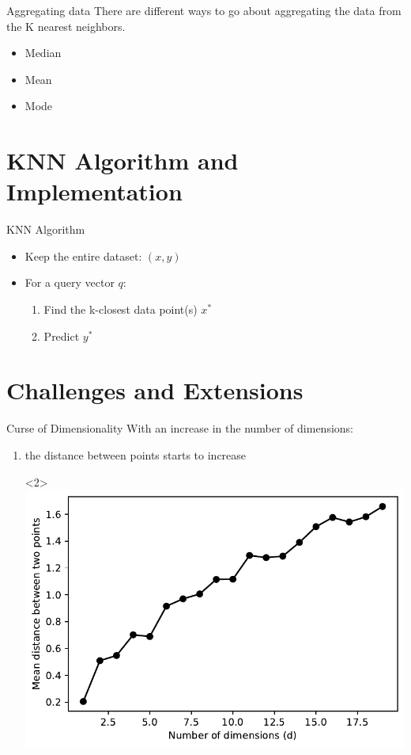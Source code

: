 \documentclass[usenames,dvipsnames]{beamer}
\begin{document}
\begin{frame}{Aggregating data}
	There are different ways to go about aggregating the data from the K nearest neighbors.
	
	
	\begin{itemize}
		\item Median
		\item Mean
		\item Mode
	\end{itemize}
\end{frame}

\section{KNN Algorithm and Implementation}

\begin{frame}{KNN Algorithm}
\begin{itemize}
\item<1-> Keep the entire dataset: ${(x,y)}$
\item<2-> For a query vector $q$:
\begin{enumerate}
\item<3-> Find the k-closest data point(s) $x^*$
\item<4-> Predict $y^*$
\end{enumerate}
\end{itemize}
\end{frame}

\section{Challenges and Extensions}

\begin{frame}{Curse of Dimensionality}
With an increase in the number of dimensions:
\begin{enumerate}
\item<2-> the distance between points starts to increase
\item[]<2> {\centering \includegraphics[height=0.6\textheight]{../assets/knn/figures/curse_dist.pdf}}
\end{enumerate}
\end{frame}
\end{document}

